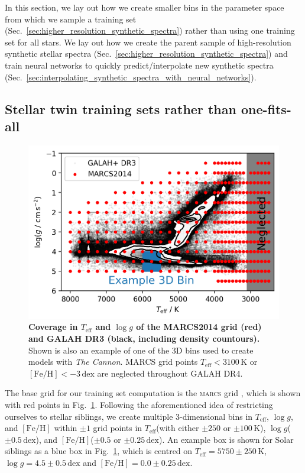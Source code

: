 \documentclass[
  journal=pasa,
  manuscript=research-paper, %
  year=2024,
  volume=37
]{cup-journal}
\newcommand{\Teff}{$T_\mathrm{eff}$\xspace}
\newcommand{\logg}{$\log g$\xspace}
\newcommand{\feh}{$\mathrm{[Fe/H]}$\xspace}
\newcommand{\TheCannon}{\textit{The Cannon}\xspace}
\newcommand{\marcs}{\textsc{marcs}\xspace}
\newcommand{\dex}{\,\mathrm{dex}}	%
\newcommand{\K}{\,\mathrm{K}}	%
\begin{document}
In this section, we lay out how we create smaller bins in the parameter space from which we sample a training set (Sec.~\ref{sec:higher_resolution_synthetic_spectra}) rather than using one training set for all stars. We lay out how we create the parent sample of high-resolution synthetic stellar spectra (Sec.~\ref{sec:higher_resolution_synthetic_spectra}) and train neural networks to quickly predict/interpolate new synthetic spectra (Sec.~\ref{sec:interpolating_synthetic_spectra_with_neural_networks}).

\subsection{Stellar twin training sets rather than one-fits-all}
\label{sec:spectrum_grid}

\begin{figure}[ht]
 \centering
 \includegraphics[width=\textwidth]{figures/teff_logg_grid_coverage.png}
 \caption{\textbf{Coverage in \Teff and \logg of the MARCS2014 grid (red) and GALAH DR3 (black, including density countours).} Shown is also an example of one of the 3D bins used to create models with \TheCannon. MARCS grid points \Teff$ < 3100\K$ or \feh$<-3\dex$ are neglected throughout GALAH DR4.}
 \label{fig:teff_logg_grid_coverage}
\end{figure}

The base grid for our training set computation is the \marcs grid \citep{Gustafsson2008}, which is shown with red points in Fig.~\ref{fig:teff_logg_grid_coverage}. Following the aforementioned idea of restricting ourselves to stellar siblings, we create multiple 3-dimensional bins in \Teff, \logg, and \feh within $\pm 1$ grid points in \Teff (with either $\pm 250$ or $\pm 100\K$), \logg ($\pm 0.5\dex$), and \feh ($\pm 0.5$ or $\pm 0.25\dex $). An example box is shown for Solar siblings as a blue box in Fig.~\ref{fig:teff_logg_grid_coverage}, which is centred on $T_\text{eff} = 5750\pm250\K$, $\log g = 4.5\pm0.5\dex$ and $\mathrm{[Fe/H]} = 0.0\pm0.25\dex$.
\end{document}
